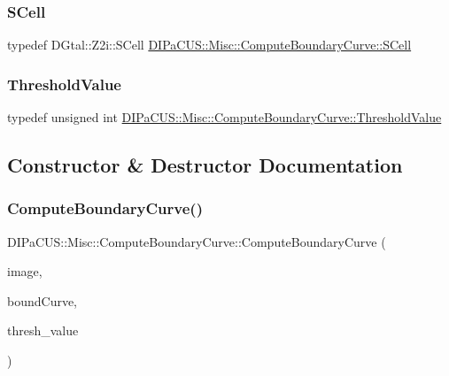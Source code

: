 \subsubsection{\texorpdfstring{S\+Cell}{SCell}}
{\footnotesize\ttfamily typedef D\+Gtal\+::\+Z2i\+::\+S\+Cell \hyperlink{structDIPaCUS_1_1Misc_1_1ComputeBoundaryCurve_affd97ae2b7fea729fca28c9a4bb16fd5}{D\+I\+Pa\+C\+U\+S\+::\+Misc\+::\+Compute\+Boundary\+Curve\+::\+S\+Cell}}

\mbox{\label{structDIPaCUS_1_1Misc_1_1ComputeBoundaryCurve_a31db1fa680bce958cccb412fac81fe14}} 
\subsubsection{\texorpdfstring{Threshold\+Value}{ThresholdValue}}
{\footnotesize\ttfamily typedef unsigned int \hyperlink{structDIPaCUS_1_1Misc_1_1ComputeBoundaryCurve_a31db1fa680bce958cccb412fac81fe14}{D\+I\+Pa\+C\+U\+S\+::\+Misc\+::\+Compute\+Boundary\+Curve\+::\+Threshold\+Value}}



\subsection{Constructor \& Destructor Documentation}
\mbox{\label{structDIPaCUS_1_1Misc_1_1ComputeBoundaryCurve_a786e98212bae383bd4080128de0c42b4}} 
\subsubsection{\texorpdfstring{Compute\+Boundary\+Curve()}{ComputeBoundaryCurve()}\hspace{0.1cm}{\footnotesize\ttfamily [1/3]}}
{\footnotesize\ttfamily D\+I\+Pa\+C\+U\+S\+::\+Misc\+::\+Compute\+Boundary\+Curve\+::\+Compute\+Boundary\+Curve (\begin{DoxyParamCaption}\item[{const \hyperlink{structDIPaCUS_1_1Misc_1_1ComputeBoundaryCurve_a67511f091a6fb85b38f29a4df3f480dd}{Image2D} \&}]{image,  }\item[{\hyperlink{structDIPaCUS_1_1Misc_1_1ComputeBoundaryCurve_ac3d7adcd3d9b37d2166c65346e0916d2}{Curve} \&}]{bound\+Curve,  }\item[{\hyperlink{structDIPaCUS_1_1Misc_1_1ComputeBoundaryCurve_a31db1fa680bce958cccb412fac81fe14}{Threshold\+Value}}]{thresh\+\_\+value }\end{DoxyParamCaption})}


